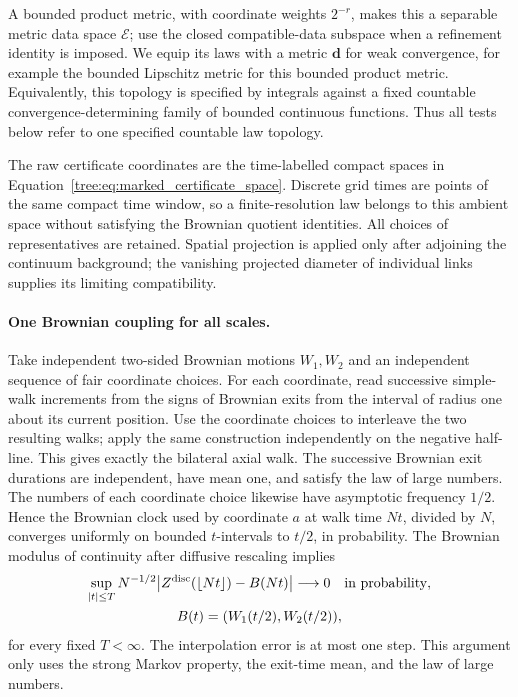 A bounded product
metric, with coordinate weights $2^{-r}$, makes this a separable
metric data space $\mathcal E$; use the closed compatible-data
subspace when a refinement identity is imposed.  We equip its
laws with a metric $\mathbf d$ for weak convergence, for example
the bounded Lipschitz metric for this bounded product metric.
Equivalently, this topology is specified by integrals against a
fixed countable convergence-determining family of bounded
continuous functions.  Thus all tests below refer to one
specified countable law topology.

The raw certificate coordinates are the time-labelled compact
spaces in Equation~\eqref{tree:eq:marked_certificate_space}.  Discrete
grid times are points of the same compact time window, so a
finite-resolution law belongs to this ambient space without
satisfying the Brownian quotient identities.  All choices of
representatives are retained.  Spatial projection is applied
only after adjoining the continuum background; the vanishing
projected diameter of individual links supplies its limiting
compatibility.

\paragraph{One Brownian coupling for all scales.}
Take independent
two-sided Brownian motions $W_1,W_2$ and an independent sequence
of fair coordinate choices.  For each coordinate, read successive
simple-walk increments from the signs of Brownian exits from the
interval of radius one about its current position.  Use the
coordinate choices to interleave the two resulting walks; apply
the same construction independently on the negative half-line.
This gives exactly the bilateral axial walk.  The successive
Brownian exit durations are independent, have mean one, and
satisfy the law of large numbers.  The numbers of each coordinate
choice likewise have asymptotic frequency $1/2$.  Hence the
Brownian clock used by coordinate $a$ at walk time $Nt$, divided
by $N$, converges uniformly on bounded $t$-intervals to $t/2$,
in probability.  The Brownian modulus of continuity after
diffusive rescaling implies
\begin{equation}
 \begin{gathered}
 \sup_{|t|\leq T}N^{-1/2}
 \bigl|Z^{\rm disc}(\lfloor Nt\rfloor)-B(Nt)\bigr|
 \longrightarrow0\quad\text{in probability},\\
 B(t)=(W_1(t/2),W_2(t/2)),
 \end{gathered}
 \label{tree:eq:bootstrap_common_coupling}
\end{equation}
for every fixed $T<\infty$.  The interpolation error is at most
one step.  This argument only uses the strong Markov property,
the exit-time mean, and the law of large numbers.

